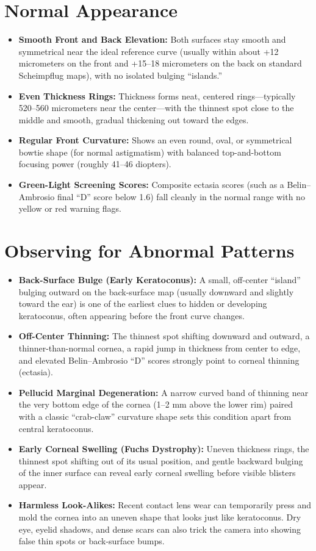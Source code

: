 \section{Normal Appearance}
\begin{itemize}
    \item \textbf{Smooth Front and Back Elevation:} Both surfaces stay smooth and symmetrical near the ideal reference curve (usually within about +12 micrometers on the front and +15--18 micrometers on the back on standard Scheimpflug maps), with no isolated bulging ``islands.''
    \item \textbf{Even Thickness Rings:} Thickness forms neat, centered rings---typically 520--560 micrometers near the center---with the thinnest spot close to the middle and smooth, gradual thickening out toward the edges.
    \item \textbf{Regular Front Curvature:} Shows an even round, oval, or symmetrical bowtie shape (for normal astigmatism) with balanced top-and-bottom focusing power (roughly 41--46 diopters).
    \item \textbf{Green-Light Screening Scores:} Composite ectasia scores (such as a Belin--Ambrosio final ``D'' score below 1.6) fall cleanly in the normal range with no yellow or red warning flags.
\end{itemize}

\section{Observing for Abnormal Patterns}
\begin{itemize}
    \item \textbf{Back-Surface Bulge (Early Keratoconus):} A small, off-center ``island'' bulging outward on the back-surface map (usually downward and slightly toward the ear) is one of the earliest clues to hidden or developing keratoconus, often appearing before the front curve changes.
    \item \textbf{Off-Center Thinning:} The thinnest spot shifting downward and outward, a thinner-than-normal cornea, a rapid jump in thickness from center to edge, and elevated Belin--Ambrosio ``D'' scores strongly point to corneal thinning (ectasia).
    \item \textbf{Pellucid Marginal Degeneration:} A narrow curved band of thinning near the very bottom edge of the cornea (1--2 mm above the lower rim) paired with a classic ``crab-claw'' curvature shape sets this condition apart from central keratoconus.
    \item \textbf{Early Corneal Swelling (Fuchs Dystrophy):} Uneven thickness rings, the thinnest spot shifting out of its usual position, and gentle backward bulging of the inner surface can reveal early corneal swelling before visible blisters appear.
    \item \textbf{Harmless Look-Alikes:} Recent contact lens wear can temporarily press and mold the cornea into an uneven shape that looks just like keratoconus. Dry eye, eyelid shadows, and dense scars can also trick the camera into showing false thin spots or back-surface bumps.
\end{itemize}

